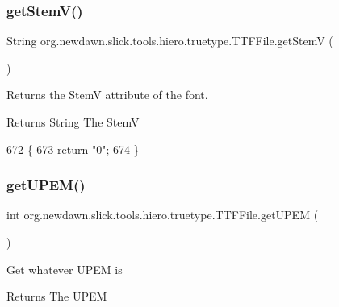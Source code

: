 \subsubsection{\texorpdfstring{get\+Stem\+V()}{getStemV()}}
{\footnotesize\ttfamily String org.\+newdawn.\+slick.\+tools.\+hiero.\+truetype.\+T\+T\+F\+File.\+get\+StemV (\begin{DoxyParamCaption}{ }\end{DoxyParamCaption})\hspace{0.3cm}{\ttfamily [inline]}}

Returns the StemV attribute of the font. \begin{DoxyReturn}{Returns}
String The StemV 
\end{DoxyReturn}

\begin{DoxyCode}
672                              \{
673         \textcolor{keywordflow}{return} \textcolor{stringliteral}{"0"};
674     \}
\end{DoxyCode}
\mbox{\label{classorg_1_1newdawn_1_1slick_1_1tools_1_1hiero_1_1truetype_1_1_t_t_f_file_a4ad1b8a157abb894e10a2ddf96270c3e}} 
\subsubsection{\texorpdfstring{get\+U\+P\+E\+M()}{getUPEM()}}
{\footnotesize\ttfamily int org.\+newdawn.\+slick.\+tools.\+hiero.\+truetype.\+T\+T\+F\+File.\+get\+U\+P\+EM (\begin{DoxyParamCaption}{ }\end{DoxyParamCaption})\hspace{0.3cm}{\ttfamily [inline]}}

Get whatever U\+P\+EM is

\begin{DoxyReturn}{Returns}
The U\+P\+EM 
\end{DoxyReturn}

